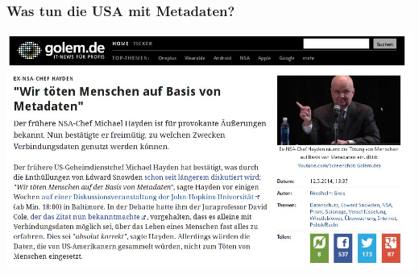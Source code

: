 \documentclass[12pt]{beamer}
\begin{document}
\subsection{}

\begin{frame}
  \frametitle{Was tun die USA mit Metadaten?}
  \pause
  \begin{center}
    \includegraphics[height=0.7\textheight]{img/wekillpeople.jpg}
  \end{center}
\end{frame}
\end{document}
